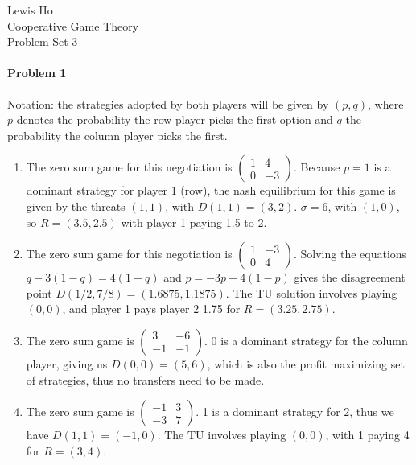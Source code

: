 \documentclass[12pt]{article}
\begin{document}
\begin{center}
  Lewis Ho\\
  Cooperative Game Theory\\
  Problem Set 3
\end{center}

\paragraph{Problem 1}
Notation: the strategies adopted by both players will be given by $(p,q)$,
where $p$ denotes the probability the row player picks the first option and
$q$ the probability the column player picks the first.
\begin{enumerate}[label=(\alph*)]
\item The zero sum game for this negotiation is $
  \begin{pmatrix}
    1 & 4\\
    0 & -3
  \end{pmatrix}.
  $
  Because $p = 1$ is a dominant strategy for player 1 (row), the nash equilibrium
  for this game is given by the threats $(1,1)$, with $D(1,1) = (3,2)$. $\sigma =
  6$, with $(1,0)$, so $R = (3.5, 2.5)$ with player 1 paying 1.5 to 2.
\item The zero sum game for this negotiation is $
  \begin{pmatrix}
    1 & -3\\
    0 & 4
  \end{pmatrix}
  $. Solving the equations $q - 3(1-q) = 4(1-q)$ and $p = -3p+4(1-p)$ gives
  the disagreement point $D(1/2,7/8) = (1.6875,1.1875)$. The TU solution involves
  playing $(0,0)$, and player 1 pays player 2 1.75 for $R = (3.25, 2.75)$.
\item The zero sum game is $
  \begin{pmatrix}
    3 & -6\\
    -1 & -1
  \end{pmatrix}
  $. 0 is a dominant strategy for the column player, giving us $D(0,0) = (5,6)$,
  which is also the profit maximizing set of strategies, thus no transfers need
  to be made.
\item The zero sum game is $
  \begin{pmatrix}
    -1 & 3\\
    -3 & 7
  \end{pmatrix}
  $. 1 is a dominant strategy for 2, thus we have $D(1,1) = (-1,0)$. The TU
  involves playing $(0,0)$, with 1 paying 4 for $R = (3,4)$.

\end{enumerate}
\end{document}
